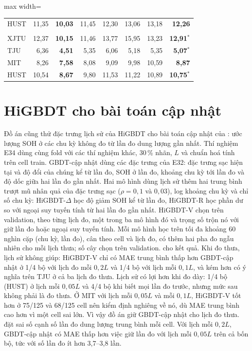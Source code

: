 \begin{table}[!htbp]
\begin{adjustbox}{max width=\textwidth}
\begin{tabular}{lrrrrrrr}
HUST & 11{,}35 & \textbf{10{,}03} & 11{,}45 & 12{,}30 & 13{,}06 & 13{,}18 & \textbf{12{,}26}\phantom{$^{*}$} \\
\addlinespace[3pt]
\multicolumn{8}{@{}l}{\textit{mọi cell train}} \\
XJTU & 12{,}37 & \textbf{10{,}15} & 11{,}46 & 13{,}77 & 15{,}95 & 13{,}23 & \textbf{12{,}91}$^{*}$ \\
TJU & 6{,}36 & \textbf{4{,}51} & 5{,}35 & 6{,}06 & 5{,}18 & 5{,}35 & \textbf{5{,}07}$^{*}$ \\
MIT & 8{,}26 & \textbf{7{,}58} & 8{,}08 & 9{,}09 & 9{,}98 & 10{,}59 & \textbf{8{,}87}\phantom{$^{*}$} \\
HUST & 10{,}54 & \textbf{8{,}67} & 9{,}80 & 11{,}53 & 11{,}22 & 10{,}89 & \textbf{10{,}75}$^{*}$ \\
\bottomrule\end{tabular}\end{adjustbox}\end{table}

\section{HiGBDT cho bài toán cập nhật}\label{sec:anchor}

Đồ án cũng thử đặc trưng lịch sử của HiGBDT cho bài toán cập nhật của : ước lượng SOH ở các chu kỳ không đo từ lần đo dung lượng gần nhất. Thí nghiệm E34 dùng cùng fold với các thí nghiệm khác, 30\,\% nhãn, $L$ và chuẩn hoá tính trên cell train. GBDT-cập nhật dùng các đặc trưng của E32: đặc trưng sạc hiện tại và độ đổi của chúng kể từ lần đo, SOH ở lần đo, khoảng chu kỳ tới lần đo và độ dốc giữa hai lần đo gần nhất. Hai mô hình dùng lịch sử thêm hai trung bình trượt mũ nhân quả của đặc trưng sạc ($\rho = 0{,}1$ và $0{,}03$), log khoảng chu kỳ và chỉ số chu kỳ: HiGBDT-$\Delta$ học độ giảm SOH kể từ lần đo, HiGBDT-R học phần dư so với ngoại suy tuyến tính từ hai lần đo gần nhất. HiGBDT-V chọn trên validation, theo từng lịch đo, một trong ba mô hình đó và trọng số trộn nó với giữ lần đo hoặc ngoại suy tuyến tính. Mỗi mô hình học trên tối đa khoảng 60 nghìn cặp (chu kỳ, lần đo), cân theo cell và lịch đo, có thêm hai pha đo ngẫu nhiên cho mỗi lịch thưa; số cây chọn trên validation.  cho kết quả. Khi đo thưa, lịch sử không giúp: HiGBDT-V chỉ có MAE trung bình thấp hơn GBDT-cập nhật ở 1/4 bộ với lịch đo mỗi $0{,}2L$ và 1/4 bộ với lịch mỗi $0{,}1L$, và kém hơn có ý nghĩa trên TJU ở cả ba lịch đo thưa. Lịch sử có lợi hơn khi đo dày: 1/4 bộ (HUST) ở lịch mỗi $0{,}05L$ và 4/4 bộ khi biết mọi lần đo trước, nhưng mức sau không phải là đo thưa. Ở MIT với lịch mỗi $0{,}05L$ và mỗi $0{,}1L$, HiGBDT-V tốt hơn ở 75/125 và 68/125 cell nên kiểm định nghiêng về nó, dù MAE trung bình cao hơn vì một cell sai lớn. Vì vậy đồ án giữ GBDT-cập nhật cho lịch đo thưa.  đặt sai số cạnh số lần đo dung lượng trung bình mỗi cell. Với lịch mỗi $0{,}2L$, GBDT-cập nhật có MAE thấp hơn việc giữ lần đo với lịch mỗi $0{,}05L$ trên cả bốn bộ, tức với số lần đo ít hơn 3{,}7--3{,}8 lần.

